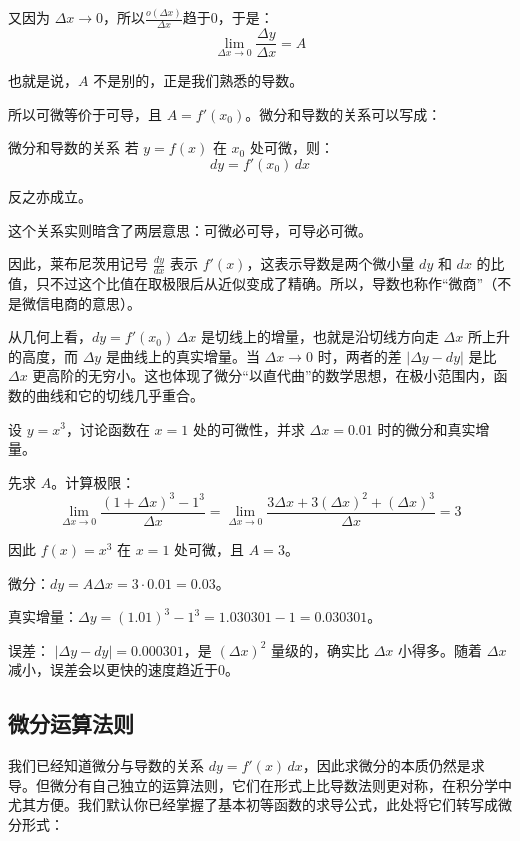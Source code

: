 又因为 $\Delta x \to 0$，所以$\frac{o(\Delta x)}{\Delta x}$趋于$0$，于是：
\[
\lim_{\Delta x \to 0} \frac{\Delta y}{\Delta x} = A
\]

也就是说，$A$ 不是别的，正是我们熟悉的导数。

所以可微等价于可导，且 $A = f'(x_0)$。微分和导数的关系可以写成：

\begin{theorem}{微分和导数的关系}{}
  若 $y=f(x)$ 在 $x_0$ 处可微，则：
  \[
  dy = f'(x_0)\, dx
  \]

  反之亦成立。
\end{theorem}

这个关系实则暗含了两层意思：可微必可导，可导必可微。

因此，莱布尼茨用记号 $\frac{dy}{dx}$ 表示 $f'(x)$，这表示导数是两个微小量 $dy$ 和 $dx$ 的比值，只不过这个比值在取极限后从近似变成了精确。所以，导数也称作“微商”（不是微信电商的意思）。

从几何上看，$dy = f'(x_0)\,\Delta x$ 是切线上的增量，也就是沿切线方向走 $\Delta x$ 所上升的高度，而 $\Delta y$ 是曲线上的真实增量。当 $\Delta x \to 0$ 时，两者的差 $|\Delta y - dy|$ 是比 $\Delta x$ 更高阶的无穷小。这也体现了微分“以直代曲”的数学思想，在极小范围内，函数的曲线和它的切线几乎重合。

\begin{myexample}
  设 $y = x^3$，讨论函数在 $x = 1$ 处的可微性，并求 $\Delta x = 0.01$ 时的微分和真实增量。

  先求 $A$。计算极限：
  \[
  \lim_{\Delta x \to 0} \frac{(1+\Delta x)^3 - 1^3}{\Delta x}
  = \lim_{\Delta x \to 0} \frac{3\Delta x + 3(\Delta x)^2 + (\Delta x)^3}{\Delta x}
  = 3
  \]

  因此 $f(x) = x^3$ 在 $x=1$ 处可微，且 $A = 3$。

  微分：$dy = A \Delta x = 3 \cdot 0.01 = 0.03$。

  真实增量：$\Delta y = (1.01)^3 - 1^3 = 1.030301 - 1 = 0.030301$。

  误差： $|\Delta y - dy| = 0.000301$，是 $(\Delta x)^2$ 量级的，确实比 $\Delta x$ 小得多。随着 $\Delta x$ 减小，误差会以更快的速度趋近于$0$。
\end{myexample}

\subsection{微分运算法则}

我们已经知道微分与导数的关系 $dy = f'(x)\,dx$，因此求微分的本质仍然是求导。但微分有自己独立的运算法则，它们在形式上比导数法则更对称，在积分学中尤其方便。我们默认你已经掌握了基本初等函数的求导公式，此处将它们转写成微分形式：

